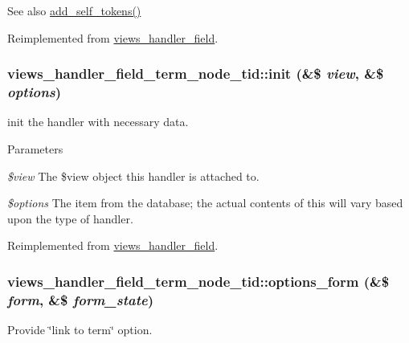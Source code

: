 \begin{DoxySeeAlso}{See also}
\hyperlink{classviews__handler__field__term__node__tid_a7fea3443ab075e3e35212ddc3b0d95f3}{add\_\-self\_\-tokens()} 
\end{DoxySeeAlso}


Reimplemented from \hyperlink{classviews__handler__field_ae33446d1059f13fbfb06a37da04d320e}{views\_\-handler\_\-field}.\hypertarget{classviews__handler__field__term__node__tid_ac3c22862ed731d0fc71d56ba9308d120}{
\subsubsection[{init}]{\setlength{\rightskip}{0pt plus 5cm}views\_\-handler\_\-field\_\-term\_\-node\_\-tid::init (\&\$ {\em view}, \/  \&\$ {\em options})}}
\label{classviews__handler__field__term__node__tid_ac3c22862ed731d0fc71d56ba9308d120}
init the handler with necessary data. 
\begin{DoxyParams}{Parameters}
\item[{\em \$view}]The \$view object this handler is attached to. \item[{\em \$options}]The item from the database; the actual contents of this will vary based upon the type of handler. \end{DoxyParams}


Reimplemented from \hyperlink{classviews__handler__field_a3a290c7df3ead81e5cd244ad5335b1cc}{views\_\-handler\_\-field}.\hypertarget{classviews__handler__field__term__node__tid_a0f0641c036e0a2498abd497cba1161a5}{
\subsubsection[{options\_\-form}]{\setlength{\rightskip}{0pt plus 5cm}views\_\-handler\_\-field\_\-term\_\-node\_\-tid::options\_\-form (\&\$ {\em form}, \/  \&\$ {\em form\_\-state})}}
\label{classviews__handler__field__term__node__tid_a0f0641c036e0a2498abd497cba1161a5}
Provide \char`\"{}link to term\char`\"{} option. 

